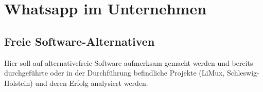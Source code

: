 \section{Whatsapp im Unternehmen}


\subsection{Freie Software-Alternativen}
Hier soll auf alternativefreie Software aufmerksam gemacht werden und bereits durchgeführte oder in der Durchführung befindliche Projekte (LiMux, Schleswig-Holstein) und deren Erfolg analysiert werden.